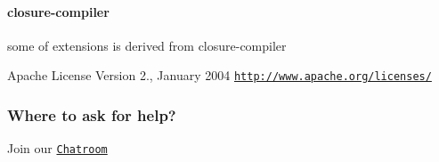 \paragraph*{closure-\/compiler}

some of extensions is derived from closure-\/compiler

Apache License Version 2., January 2004 \href{http://www.apache.org/licenses/}{\tt http\+://www.\+apache.\+org/licenses/}

\subsubsection*{Where to ask for help?}

Join our \href{https://gitter.im/eslint/doctrine}{\tt Chatroom} 